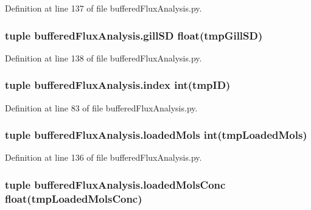 Definition at line 137 of file buffered\-Flux\-Analysis.\-py.

\hypertarget{namespacebuffered_flux_analysis_a74dcc41e82d94dda58e3e18fd94b9563}{
\subsubsection[{gill\-S\-D}]{\setlength{\rightskip}{0pt plus 5cm}tuple buffered\-Flux\-Analysis.\-gill\-S\-D float(tmp\-Gill\-S\-D)}}\label{namespacebuffered_flux_analysis_a74dcc41e82d94dda58e3e18fd94b9563}


Definition at line 138 of file buffered\-Flux\-Analysis.\-py.

\hypertarget{namespacebuffered_flux_analysis_af7658ba15697dfeb9cd4bff8a57c7360}{
\subsubsection[{index}]{\setlength{\rightskip}{0pt plus 5cm}tuple buffered\-Flux\-Analysis.\-index int(tmp\-I\-D)}}\label{namespacebuffered_flux_analysis_af7658ba15697dfeb9cd4bff8a57c7360}


Definition at line 83 of file buffered\-Flux\-Analysis.\-py.

\hypertarget{namespacebuffered_flux_analysis_ae753e3b6694200ad57523072a4a2dbf1}{
\subsubsection[{loaded\-Mols}]{\setlength{\rightskip}{0pt plus 5cm}tuple buffered\-Flux\-Analysis.\-loaded\-Mols int(tmp\-Loaded\-Mols)}}\label{namespacebuffered_flux_analysis_ae753e3b6694200ad57523072a4a2dbf1}


Definition at line 136 of file buffered\-Flux\-Analysis.\-py.

\hypertarget{namespacebuffered_flux_analysis_a7e05b85cf7e9b63ac9aa0582932185b4}{
\subsubsection[{loaded\-Mols\-Conc}]{\setlength{\rightskip}{0pt plus 5cm}tuple buffered\-Flux\-Analysis.\-loaded\-Mols\-Conc float(tmp\-Loaded\-Mols\-Conc)}}\label{namespacebuffered_flux_analysis_a7e05b85cf7e9b63ac9aa0582932185b4}


